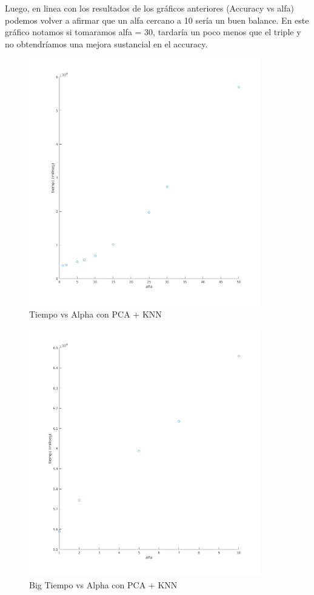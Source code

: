 Luego, en linea con los resultados de los gráficos anteriores (Accuracy vs alfa) podemos volver a afirmar que un alfa cercano a 10 sería un buen balance. En este gráfico notamos si tomaramos alfa = 30, tardaría un poco menos que el triple y no obtendríamos una mejora sustancial en el accuracy.
\begin{figure}[H]
	\centering	\includegraphics[width=0.9\textwidth]{img/alfa_pca_tiempo.png}
	\caption{Tiempo vs Alpha con PCA + KNN}
	\label{fig:Tiempo vs Alpha con PCA + KNN}
\end{figure}

\begin{figure}[H]
	\centering	\includegraphics[width=0.9\textwidth]{img/big_alfa_pca_tiempo.png}
	\caption{Big Tiempo vs Alpha con PCA + KNN}
	\label{fig:Big Tiempo vs Alpha con PCA + KNN}
\end{figure}





